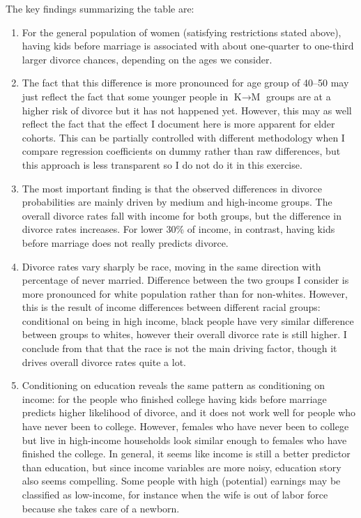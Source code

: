\documentclass[12pt,letter]{article}
\begin{document}
The key findings summarizing the table are:
\begin{enumerate}
\item For the general population of women (satisfying restrictions stated above), having kids before marriage is associated with about one-quarter to one-third larger divorce chances, depending on the ages we consider.
\item The fact that this difference is more pronounced for age group of 40--50 may just reflect the fact that some younger people in $\text{K}\to\text{M}$ groups are at a higher risk of divorce but it has not happened yet. However, this may as well reflect the fact that the effect I document here is more apparent for elder cohorts. This can be partially controlled with different methodology when I compare regression coefficients on dummy rather than raw differences, but this approach is less transparent so I do not do it in this exercise. 
\item The most important finding is that the observed differences in divorce probabilities are mainly driven by medium and high-income groups. The overall divorce rates fall with income for both groups, but the difference in divorce rates increases. For lower 30\% of income, in contrast, having kids before marriage does not really predicts divorce.
\item Divorce rates vary sharply be race, moving in the same direction with percentage of never married. Difference between the two groups I consider is more pronounced for white population rather than for non-whites. However, this is the result of income differences between different racial groups: conditional on being in high income, black people have very similar difference between groups to whites, however their overall divorce rate is still higher. I conclude from that that the race is not the main driving factor, though it drives overall divorce rates quite a lot.
\item Conditioning on education reveals the same pattern as conditioning on income: for the people who finished college having kids before marriage predicts higher likelihood of divorce, and it does not work well for people who have never been to college. However, females who have never been to college but live in high-income households look similar enough to females who have finished the college. In general, it seems like income is still a better predictor than education, but since income variables are more noisy, education story also seems compelling. Some people with high (potential) earnings may be classified as low-income, for instance when the wife is out of labor force because she takes care of a newborn.
\end{enumerate}
\end{document}
